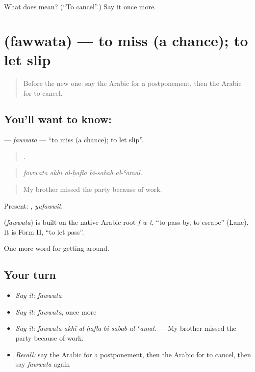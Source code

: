 \begin{tcolorbox}[breakable,colback=teal!4,colframe=teal!35!black,title={Before you move on}]
What does  mean? (\textquotedblleft{}To cancel\textquotedblright{}.) Say it once more.
\end{tcolorbox}
\section[\texorpdfstring{\ar{فوت} (fawwata)}{فوت (fawwata)}]{ (fawwata) — to miss (a chance); to let slip}

\label{lesson:AR-C461-fawwata}



\begin{quote}
Before the new one: say the Arabic for a postponement, then the Arabic for to cancel.
\end{quote}

\subsection*{You'll want to know: }
\textbf{} — \emph{fawwata} — \textquotedblleft{}to miss (a chance); to let slip\textquotedblright{}.

\begin{quote}
    .
\end{quote}

\begin{quote}
\emph{fawwata akhī al-ḥafla bi-sabab al-ʿamal.}
\end{quote}

\begin{quote}
My brother missed the party because of work.
\end{quote}

Present: , \emph{yufawwit}.

\begin{cousinweb}
\textbf{} (\emph{fawwata}) is built on the native Arabic root \emph{f-w-t}, \textquotedblleft{}to pass by, to escape\textquotedblright{} (Lane). It is Form II, \textquotedblleft{}to let pass\textquotedblright{}.
\end{cousinweb}

\begin{grammarlens}[title={What you've built}]
One more word for getting around.
\end{grammarlens}

\subsection*{Your turn}
\begin{itemize}
\raggedright
  \item \emph{Say it:} \emph{fawwata}
  \item \emph{Say it:} \emph{fawwata}, once more
  \item \emph{Say it:} \emph{fawwata akhī al-ḥafla bi-sabab al-ʿamal.} — My brother missed the party because of work.
  \item \emph{Recall:} say the Arabic for a postponement, then the Arabic for to cancel, then say \emph{fawwata} again
\end{itemize}

